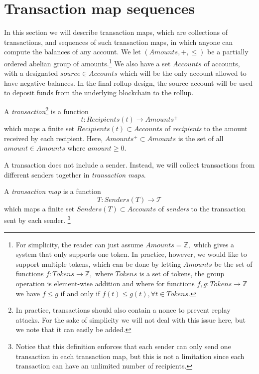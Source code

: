 \section{Transaction map sequences}\label{section:transaction-map-sequences}

In this section we will describe transaction maps, which are collections of transactions, and sequences of such transaction maps, in which anyone can compute the balances of any account. We let \((Amounts, +, \leq)\) be a partially ordered abelian group of amounts.\footnote{For simplicity, the reader can just assume \(Amounts = \mathbb{Z},\) which gives a system that only supports one token. In practice, however, we would like to support multiple tokens, which can be done by letting \(Amounts\) be the set of functions \(f : Tokens \to \mathbb{Z},\) where \(Tokens\) is a set of tokens, the group operation is element-wise addition and where for functions \(f,g : Tokens \to \mathbb{Z}\) we have \(f \leq g\) if and only if \(f(t) \leq g(t), \forall t \in Tokens\).} We also have a set \(Accounts\) of accounts, with a designated \(source \in Accounts\) which will be the only account allowed to have negative balances. In the final rollup design, the source account will be used to deposit funds from the underlying blockchain to the rollup.

\begin{defn}[Transaction]
  A \emph{transaction}\footnote{In practice, transactions should also contain a nonce to prevent replay attacks. For the sake of simplicity we will not deal with this issue here, but we note that it can easily be added.} is a function \[t : Recipients(t) \rightarrow Amounts^+\] which maps a finite set \(Recipients(t) \subset Accounts\) of \emph{recipients} to the amount received by each recipient. Here, \(Amounts^+ \subset Amounts\) is the set of all \(amount \in Amounts\) where \(amount \geq 0\).
\end{defn}

A transaction does not include a sender. Instead, we will collect transactions from different senders together in \emph{transaction maps}.

\begin{defn}
  A \emph{transaction map} is a function \[T : Senders(T) \rightarrow \mathcal{T}\] which maps a finite set \(Senders(T) \subset Accounts\) of \emph{senders} to the transaction sent by each sender. \footnote{Notice that this definition enforces that each sender can only send one transaction in each transaction map, but this is not a limitation since each transaction can have an unlimited number of recipients.}
\end{defn}

